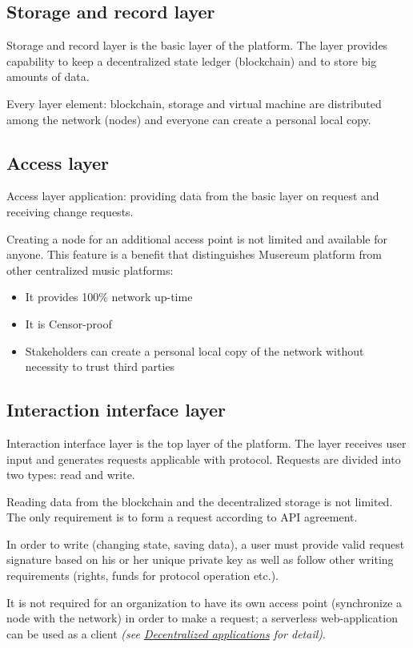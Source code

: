 \documentclass[12pt]{report}
\begin{document}
\subsection{Storage and record layer}
\label{tech-arch-underlayer}
\begin{multicols}{2}
Storage and record layer is the basic layer of the platform. The layer provides capability to keep a decentralized state ledger (blockchain) and to store big amounts of data.

Every layer element: blockchain, storage and virtual machine are distributed among the network (nodes) and everyone can create a personal local copy.
\end{multicols}
\subsection{Access layer}
\label{tech-arch-connect}
\begin{multicols}{2}
Access layer application: providing data from the basic layer on request and receiving change requests.

Creating a node for an additional access point is not limited and available for anyone. This feature is a benefit that distinguishes Musereum platform from other centralized music platforms:

\begin{itemize}
	\item It provides 100\% network up-time
	\item It is Censor-proof
	\item Stakeholders can create a personal local copy of the network without necessity to trust third parties
\end{itemize}
\end{multicols}
\pagebreak
\subsection{Interaction interface layer}
\label{tech-arch-interfaces}
\begin{multicols}{2}
Interaction interface layer is the top layer of the platform. The layer receives user input and generates requests applicable with protocol. Requests are divided into two types: read and write.

Reading data from the blockchain and the decentralized storage is not limited. The only requirement is to form a request according to API agreement.

In order to write (changing state, saving data), a user must provide valid request signature based on his or her unique private key as well as follow other writing requirements (rights, funds for protocol operation etc.).

It is not required for an organization to have its own access point (synchronize a node with the network) in order to make a request; a serverless web-application can be used as a client \textit{(see \hyperref[tech-apps]{Decentralized applications} for detail)}.

\end{multicols}
\end{document}
